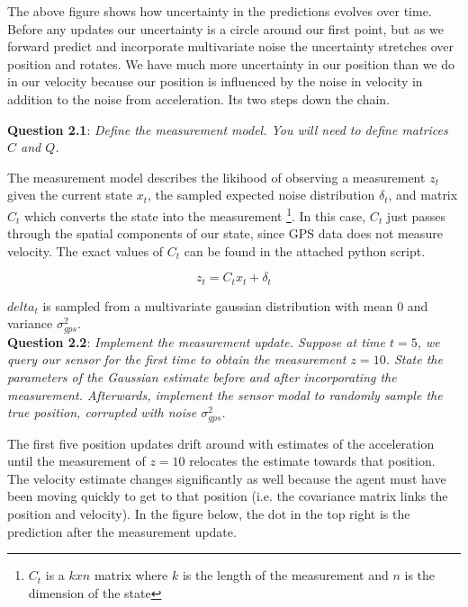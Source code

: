 \documentclass{article}
\begin{document}
The above figure shows how uncertainty in the predictions evolves over time. Before any updates our uncertainty is a circle around our first point, but as we forward predict and incorporate multivariate noise the uncertainty stretches over position and rotates. We have much more uncertainty in our position than we do in our velocity because our position is influenced by the noise in velocity in addition to the noise from acceleration. Its two steps down the chain.

{\bf Question 2.1}: \textit{Define the measurement model. You will need to define matrices $C$ and $Q$. \\}

The measurement model describes the likihood of observing a measurement $z_t$ given the current state $x_t$, the sampled expected noise distribution $\delta_t$, and matrix $C_t$ which converts the state into the measurement \footnote{$C_t$ is a $kxn$ matrix where $k$ is the length of the measurement and $n$ is the dimension of the state}. In this case, $C_t$ just passes through the spatial components of our state, since GPS data does not measure velocity. The exact values of $C_t$ can be found in the attached python script. 

\begin{equation}
    z_t = C_tx_t + \delta_t
\end{equation}

$delta_t$ is sampled from a multivariate gaussian distribution with mean 0 and variance $\sigma_{gps}^2$. \\

{\bf Question 2.2}: \textit{Implement the measurement update. Suppose at time $t = 5$, we query our sensor for the first time to obtain the measurement $z = 10$. State the parameters of the Gaussian estimate before and after incorporating the measurement. Afterwards, implement the sensor modal to randomly sample the true position, corrupted with noise $\sigma_{gps}^2$. \\}

The first five position updates drift around with estimates of the acceleration until the measurement of $z=10$ relocates the estimate towards that position. The velocity estimate changes significantly as well because the agent must have been moving quickly to get to that position (i.e. the covariance matrix links the position and velocity). In the figure below, the dot in the top right is the prediction after the measurement update. 
\end{document}
